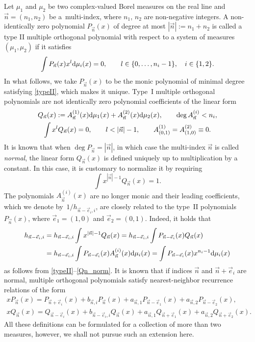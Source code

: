 \documentclass[10pt,a4paper]{amsart}
\numberwithin{equation}{section}
\newcommand{\n}{{\vec n}}
\begin{document}
Let $ \mu_1 $ and $ \mu_2 $ be two complex-valued Borel measures on the real line and $ \n=(n_1,n_2) $ be a~multi-index, where $ n_1$, $n_2 $ are non-negative integers. A non-identically zero polynomial $ P_{\n}(x) $ of degree at most $ |\n| := n_1+n_2 $ is called a type II multiple orthogonal polynomial with respect to a system of measures $ (\mu_1,\mu_2) $ if it satisfies
\begin{equation}\label{typeII}
\int P_\n(x)x^l{\rm d}\mu_i(x) =0, \qquad l\in\{0,\dots,n_i-1\}, \quad i\in\{1,2\}.
\end{equation}
In what follows, we take $ P_\n(x) $ to be the monic polynomial of minimal degree satisfying \eqref{typeII}, which makes it unique. Type~I multiple orthogonal polynomials are not identically zero polynomial coefficients of the linear form
\begin{gather}
Q_\n(x):= A_\n^{(1)}(x){\rm d}\mu_1(x) + A_\n^{(2)}(x){\rm d}\mu_2(x), \qquad \deg A_\n^{(i)} < n_i, \nonumber \\
\int x^lQ_\n(x) = 0, \qquad l<|\n|-1, \qquad A_{(0,1)}^{(1)} = A_{(1,0)}^{(2)} \equiv 0.\label{typeI}
\end{gather}
It is known \cite[Section~23.1]{Ismail} that when $\deg P_\n=|\n|$, in which case the multi-index $ \n $ is called \emph{normal}, the linear form $ Q_\n(x) $ is defined uniquely up to multiplication by a constant. In this case, it is customary to normalize it by requiring
\begin{equation}
\label{Qn_norm}
\int x^{|\n|-1}Q_{\n}(x)=1 .
\end{equation}
The polynomials $ A_\n^{(i)}(x) $ are no longer monic and their leading coefficients, which we denote by~$ 1/h_{\n-\vec e_i,i} $, are closely related to the type~II polynomials $ P_\n(x) $, where $ \vec e_1=(1,0) $ and $ \vec e_2 = (0,1) $. Indeed, it holds that
\begin{align}
\label{connection}
h_{\n-\vec e_i,i} &= h_{\n-\vec e_i,i} \int x^{|\n|-1}Q_\n(x) = h_{\n-\vec e_i,i}\int P_{\n-\vec e_i}(x)Q_\n(x) \nonumber \\
& = h_{\n-\vec e_i,i}\int P_{\n-\vec e_i}(x) A_\n^{(i)}(x){\rm d}\mu_i(x) = \int P_{\n-\vec e_i}(x) x^{n_i-1}{\rm d}\mu_i(x)
\end{align}
as follows from \eqref{typeII}--\eqref{Qn_norm}. It is known \cite[Theorem~23.1.11]{Ismail} that if indices $ \n $ and $ \n+\vec e_i $ are normal, multiple orthogonal polynomials satisfy nearest-neighbor recurrence relations of the form
\begin{gather}
xP_\n(x) = P_{\n+\vec e_i}(x) + b_{\n,i}P_\n(x) + a_{\n,1}P_{\n-\vec e_1}(x) + a_{\n,2}P_{\n-\vec e_2}(x), \nonumber \\
xQ_\n(x) = Q_{\n-\vec e_i}(x) + b_{\n-\vec e_i,i}Q_\n(x) + a_{\n,1}Q_{\n+\vec e_1}(x) + a_{\n,2}Q_{\n+\vec e_2}(x).\label{rec_rel}
\end{gather}
All these definitions can be formulated for a collection of more than two measures, however, we shall not pursue such an extension here.
\end{document}
